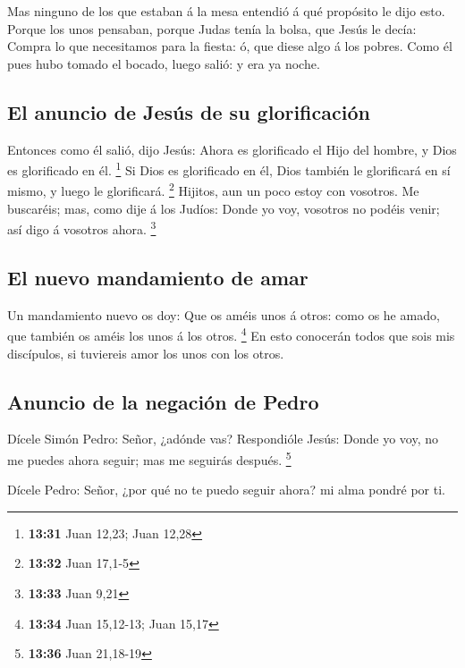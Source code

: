  Mas ninguno de los que estaban á la mesa entendió á qué
propósito le dijo esto.  Porque los unos pensaban, porque
Judas tenía la bolsa, que Jesús le decía: Compra lo que necesitamos para
la fiesta: ó, que diese algo á los pobres.  Como él pues
hubo tomado el bocado, luego salió: y era ya noche.

\hypertarget{el-anuncio-de-jesuxfas-de-su-glorificaciuxf3n}{%
\subsection{El anuncio de Jesús de su
glorificación}\label{el-anuncio-de-jesuxfas-de-su-glorificaciuxf3n}}

 Entonces como él salió, dijo Jesús: Ahora es glorificado
el Hijo del hombre, y Dios es glorificado en él. \footnote{\textbf{13:31}
  Juan 12,23; Juan 12,28}  Si Dios es glorificado en él,
Dios también le glorificará en sí mismo, y luego le glorificará.
\footnote{\textbf{13:32} Juan 17,1-5}  Hijitos, aun un poco
estoy con vosotros. Me buscaréis; mas, como dije á los Judíos: Donde yo
voy, vosotros no podéis venir; así digo á vosotros ahora. \footnote{\textbf{13:33}
  Juan 9,21}

\hypertarget{el-nuevo-mandamiento-de-amar}{%
\subsection{El nuevo mandamiento de
amar}\label{el-nuevo-mandamiento-de-amar}}

 Un mandamiento nuevo os doy: Que os améis unos á otros:
como os he amado, que también os améis los unos á los otros. \footnote{\textbf{13:34}
  Juan 15,12-13; Juan 15,17}  En esto conocerán todos que
sois mis discípulos, si tuviereis amor los unos con los otros.

\hypertarget{anuncio-de-la-negaciuxf3n-de-pedro}{%
\subsection{Anuncio de la negación de
Pedro}\label{anuncio-de-la-negaciuxf3n-de-pedro}}

 Dícele Simón Pedro: Señor, ¿adónde vas? Respondióle Jesús:
Donde yo voy, no me puedes ahora seguir; mas me seguirás después.
\footnote{\textbf{13:36} Juan 21,18-19}

 Dícele Pedro: Señor, ¿por qué no te puedo seguir ahora? mi
alma pondré por ti.

